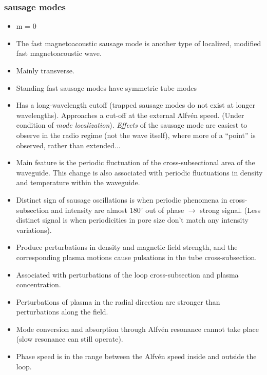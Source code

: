 \documentclass{article}
\begin{document}
\subsubsection{sausage modes}
\begin{itemize}
    \item m = 0
    \item The fast magnetoacoustic sausage mode is another type of
        localized, modified fast magnetoacoustic wave.
    \item Mainly transverse.
    \item Standing fast sausage modes have symmetric tube modes
    \item Has a long-wavelength cutoff (trapped sausage modes do
        not exist at longer wavelengths).
        Approaches a cut-off at the external Alfv\'en speed.
        (Under condition of \emph{mode localization}).
        \emph{Effects} of the sausage mode are easiest to observe in
        the radio regime (not the wave itself), where more of a
        ``point'' is observed, rather than extended$\ldots$
    \item Main feature is the periodic fluctuation of the cross-subsectional
        area of the waveguide. This change is also associated with
        periodic fluctuations in density and temperature within the
        waveguide.
    \item Distinct sign of sausage oscillations is when periodic
        phenomena in cross-subsection and intensity are almost
        180$^{\circ}$ out of phase $\rightarrow$ strong signal.
        (Less distinct signal is when periodicities in pore size
        don't match any intensity variations).
    \item Produce perturbations in density and magnetic field strength,
        and the corresponding plasma motions cause pulsations in the
        tube cross-subsection.
    \item Associated with perturbations of the loop cross-subsection
        and plasma concentration.
    \item Perturbations of plasma in the radial direction are stronger
        than perturbations along the field.
    \item Mode conversion and absorption through Alfv\'en resonance
        cannot take place (slow resonance can still operate).
    \item Phase speed is in the range between the Alfv\'en speed inside
        and outside the loop.
\end{itemize}
\end{document}
